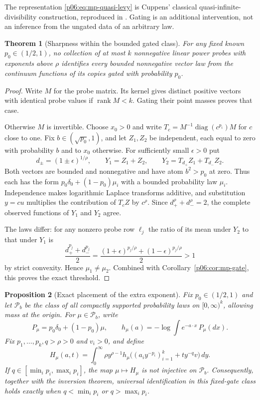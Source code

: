 \documentclass[11pt,letterpaper]{article}
\newtheorem{theorem}{Theorem}[section]
\newtheorem{proposition}[theorem]{Proposition}
\theoremstyle{definition}
\theoremstyle{remark}
\newcommand{\1}{\mathbf 1}
\begin{document}
The representation \eqref{p06:eq:mp-quasi-levy} is Cuppens' classical
quasi-infinite-divisibility construction, reproduced in
\cite[Theorem 3.2]{BKL}. Gating is an additional intervention,
not an inference from the ungated data of an arbitrary law.

\begin{theorem}[Sharpness within the bounded gated class]
\label{p06:thm:mp-bounded-minimal}
For any fixed known $p_0\in(1/2,1)$, no collection of at most
$k$ nonnegative linear power probes with exponents above $\rho$
identifies every bounded nonnegative vector law from the continuum
functions of its copies gated with probability $p_0$.
\end{theorem}
\begin{proof}
Write $M$ for the probe matrix. Its kernel gives distinct positive
vectors with identical probe values if $\operatorname{rank}M<k$.
Gating their point masses proves that case.

Otherwise $M$ is invertible. Choose $x_0>0$ and write
$T_c=M^{-1}\operatorname{diag}(c^{p_i})M$ for $c$ close to one.
Fix $b\in(\sqrt{p_0},1)$, and let $Z_1,Z_2$ be independent,
each equal to zero with probability $b$ and to $x_0$ otherwise.
For sufficiently small $\epsilon>0$ put
\[
 d_\pm=(1\pm\epsilon)^{1/\rho},\qquad
 Y_1=Z_1+Z_2,\qquad Y_2=T_{d_+}Z_1+T_{d_-}Z_2.
\]
Both vectors are bounded and nonnegative and have atom $b^2>p_0$
at zero. Thus each has the form
$p_0\delta_0+(1-p_0)\mu_i$ with a bounded probability law $\mu_i$.
Independence makes logarithmic Laplace transforms additive, and
substitution $y=cu$ multiplies the contribution of $T_cZ$ by
$c^\rho$. Since $d_+^\rho+d_-^\rho=2$, the complete observed
functions of $Y_1$ and $Y_2$ agree.

The laws differ: for any nonzero probe row $\ell_j$ the ratio
of its mean under $Y_2$ to that under $Y_1$ is
\[
 \frac{d_+^{p_j}+d_-^{p_j}}2
 =\frac{(1+\epsilon)^{p_j/\rho}
                  +(1-\epsilon)^{p_j/\rho}}2>1
\]
by strict convexity. Hence $\mu_1\ne\mu_2$. Combined with
Corollary~\ref{p06:cor:mp-gate}, this proves the exact threshold.
\end{proof}

\begin{proposition}[Exact placement of the extra exponent]\label{p06:prop:exact-placement}
Fix $p_0\in(1/2,1)$ and let $\mathcal P_b$ be the class of all compactly
supported probability laws on $[0,\infty)^k$, allowing mass at the origin.
For $\mu\in\mathcal P_b$, write
\[
 P_\mu=p_0\delta_0+(1-p_0)\mu,\qquad
 h_\mu(a)=-\log\int e^{-a\cdot x}\,P_\mu(dx).
\]
Fix $p_1,\ldots,p_k,q>\rho>0$ and $v_i>0$, and define
\[
 H_\mu(a,t)=\int_0^\infty \rho y^{\rho-1}
 h_\mu\bigl((a_i y^{-p_i})_{i=1}^k+t y^{-q}v\bigr)\,dy.
\]
If $q\in[\min_i p_i,\max_i p_i]$, the map
$\mu\mapsto H_\mu$ is not injective on $\mathcal P_b$.
Consequently, together with the inversion theorem, universal identification
in this fixed-gate class holds exactly when
$q<\min_i p_i$ or $q>\max_i p_i$.
\end{proposition}
\end{document}
